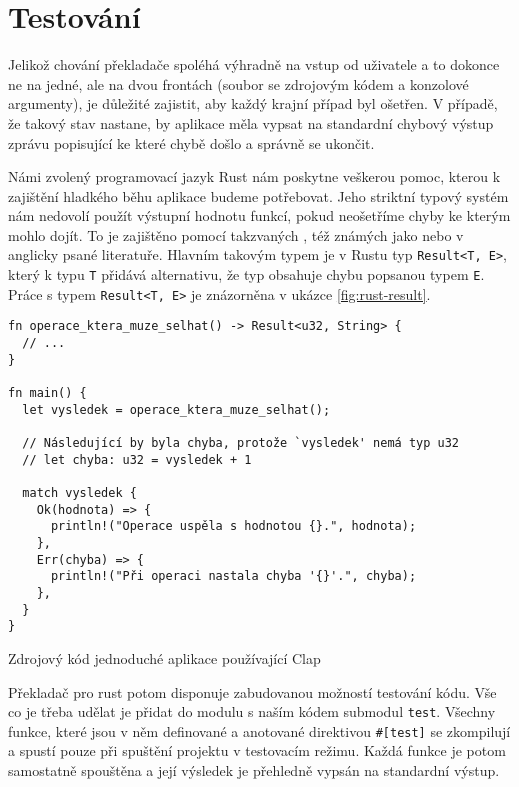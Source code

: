 \section{Testování}
\label{sec:asm-test}

Jelikož chování překladače spoléhá výhradně na vstup od uživatele a to dokonce ne na jedné, ale na dvou frontách (soubor se zdrojovým kódem a konzolové argumenty), je důležité zajistit, aby každý krajní případ byl ošetřen. V případě, že takový stav nastane, by aplikace měla vypsat na standardní chybový výstup zprávu popisující ke které chybě došlo a správně se ukončit.

Námi zvolený programovací jazyk Rust nám poskytne veškerou pomoc, kterou k zajištění hladkého běhu aplikace budeme potřebovat. Jeho striktní typový systém nám nedovolí použít výstupní hodnotu funkcí, pokud neošetříme chyby ke kterým mohlo dojít. To je zajištěno pomocí takzvaných , též známých jako  nebo  v anglicky psané literatuře. Hlavním takovým typem je v Rustu typ \texttt{Result<T, E>}, který k typu \texttt{T} přidává alternativu, že typ obsahuje chybu popsanou typem \texttt{E}. Práce s typem \texttt{Result<T, E>} je znázorněna v ukázce \ref{fig:rust-result}.

\begin{listing}
\begin{verbatim}
fn operace_ktera_muze_selhat() -> Result<u32, String> {
  // ...
} 

fn main() {
  let vysledek = operace_ktera_muze_selhat();
  
  // Následující by byla chyba, protože `vysledek' nemá typ u32
  // let chyba: u32 = vysledek + 1
  
  match vysledek {
    Ok(hodnota) => {
      println!("Operace uspěla s hodnotou {}.", hodnota);
    },
    Err(chyba) => {
      println!("Při operaci nastala chyba '{}'.", chyba);
    },
  }
}
\end{verbatim}
\caption{Zdrojový kód jednoduché aplikace používající Clap}
\label{fig:rust-result}
\end{listing}

Překladač pro rust potom disponuje zabudovanou možností testování kódu. Vše co je třeba udělat je přidat do modulu s naším kódem submodul \texttt{test}. Všechny funkce, které jsou v něm definované a anotované direktivou \texttt{#[test]} se zkompilují a spustí pouze při spuštění projektu v testovacím režimu. Každá funkce je potom samostatně spouštěna a její výsledek je přehledně vypsán na standardní výstup.

